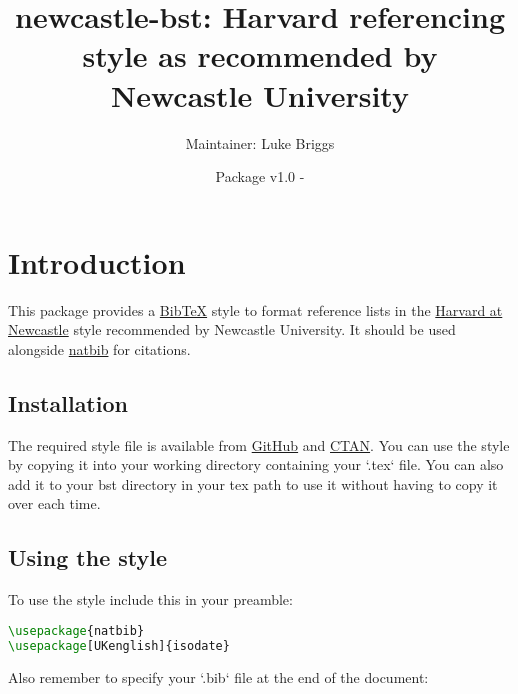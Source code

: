 \documentclass{article}
\begin{document}
\title{newcastle-bst: Harvard referencing style as recommended by Newcastle University}
\author{Maintainer: Luke Briggs}
\date{Package v1.0 - }
\maketitle

\section{Introduction}
This package provides a \href{https://ctan.org/pkg/BibTeX}{BibTeX} style to format reference lists in the \href{https://libguides.ncl.ac.uk/managing/harvard}{Harvard at Newcastle} style recommended by Newcastle University. 
It should be used alongside \href{https://ctan.org/pkg/natbib}{natbib} for citations.

\subsection{Installation}
The required style file is available from \href{https://github.com/LukeBriggsDev/Newcastle-BibTeX}{GitHub} and \href{https://ctan.org/pkg/newcastle-bst}{CTAN}. 
You can use the style by copying it into your working directory containing your `.tex` file. 
You can also add it to your bst directory in your tex path to use it without having to copy it over each time.

\subsection{Using the style}
To use the style include this in your preamble:
\begin{lstlisting}[language=tex]
\usepackage{natbib}
\usepackage[UKenglish]{isodate}

\end{lstlisting}

Also remember to specify your `.bib` file at the end of the document:
\begin{lstlisting}[language=tex]

\end{lstlisting}
\end{document}
